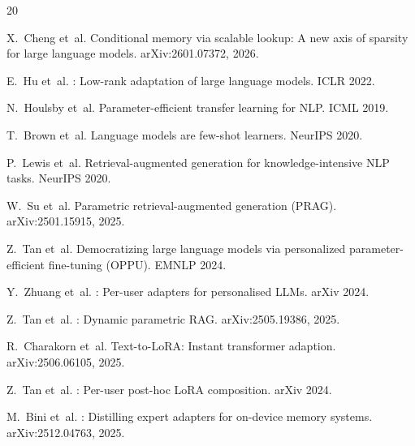 \documentclass{article}
\begin{document}


\begin{thebibliography}{20}

X.~Cheng et~al.
\newblock Conditional memory via scalable lookup: A new axis of sparsity for
  large language models.
\newblock arXiv:2601.07372, 2026.

E.~Hu et~al.
: Low-rank adaptation of large language models.
\newblock ICLR 2022.

N.~Houlsby et~al.
\newblock Parameter-efficient transfer learning for {NLP}.
\newblock ICML 2019.

T.~Brown et~al.
\newblock Language models are few-shot learners.
\newblock NeurIPS 2020.

P.~Lewis et~al.
\newblock Retrieval-augmented generation for knowledge-intensive {NLP} tasks.
\newblock NeurIPS 2020.

W.~Su et~al.
\newblock Parametric retrieval-augmented generation ({PRAG}).
\newblock arXiv:2501.15915, 2025.

Z.~Tan et~al.
\newblock Democratizing large language models via personalized parameter-efficient fine-tuning ({OPPU}).
\newblock EMNLP 2024.

Y.~Zhuang et~al.
: Per-user adapters for personalised {LLMs}.
\newblock arXiv 2024.

Z.~Tan et~al.
: Dynamic parametric {RAG}.
\newblock arXiv:2505.19386, 2025.

R.~Charakorn et~al.
\newblock Text-to-{LoRA}: Instant transformer adaption.
\newblock arXiv:2506.06105, 2025.

Z.~Tan et~al.
: Per-user post-hoc {LoRA} composition.
\newblock arXiv 2024.

M.~Bini et~al.
: Distilling expert adapters for on-device memory systems.
\newblock arXiv:2512.04763, 2025.


\end{thebibliography}
\end{document}
